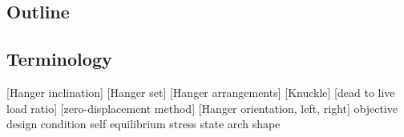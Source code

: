 \subsection{Outline} \label{sec:int_out}


\subsection{Terminology} \label{sec:int_term}
[Hanger inclination]
[Hanger set]
[Hanger arrangements]
[Knuckle]
[dead to live load ratio]
[zero-displacement method]
[Hanger orientation, left, right]
objective
design condition
self equilibrium stress state
arch shape
